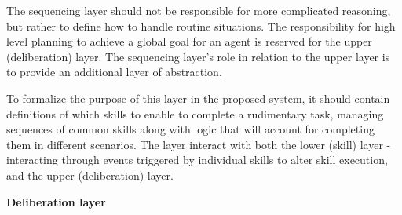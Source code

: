 \documentclass[main.tex]{subfiles}
\begin{document}
The sequencing layer should not be responsible for more complicated reasoning, but rather 
to define how to handle routine situations. The responsibility for high level planning to achieve 
a global goal for an agent is reserved for the upper (deliberation) layer. The sequencing layer's 
role in relation to the upper layer is to provide an additional layer of abstraction.

To formalize the purpose of this layer in the proposed system, it should contain definitions 
of which skills to enable to complete a rudimentary task, managing sequences of common skills
along with logic that will account for completing them in different scenarios. The layer
interact with both the lower (skill) layer - interacting through events triggered by individual
skills to alter skill execution, and the upper (deliberation) layer. 




\textbf{Deliberation layer}
\end{document}
